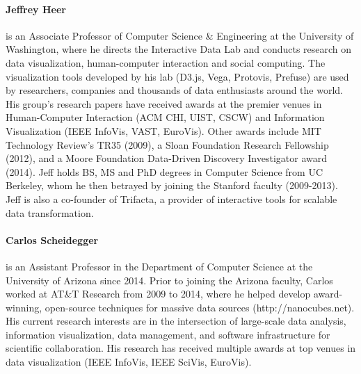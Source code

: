 \documentclass[journal]{vgtc}                %
\begin{document}
\paragraph*{Jeffrey Heer} is an Associate Professor of Computer Science \& Engineering at the University of Washington, where he directs the Interactive Data Lab and conducts research on data visualization, human-computer interaction and social computing. The visualization tools developed by his lab (D3.js, Vega, Protovis, Prefuse) are used by researchers, companies and thousands of data enthusiasts around the world. His group's research papers have received awards at the premier venues in Human-Computer Interaction (ACM CHI, UIST, CSCW) and Information Visualization (IEEE InfoVis, VAST, EuroVis). Other awards include MIT Technology Review's TR35 (2009), a Sloan Foundation Research Fellowship (2012), and a Moore Foundation Data-Driven Discovery Investigator award (2014). Jeff holds BS, MS and PhD degrees in Computer Science from UC Berkeley, whom he then betrayed by joining the Stanford faculty (2009-2013). Jeff is also a co-founder of Trifacta, a provider of interactive tools for scalable data transformation.

\paragraph*{Carlos Scheidegger} is an Assistant Professor in the Department of Computer Science at the University of Arizona since 2014. Prior to joining the Arizona faculty, Carlos worked at AT\&T Research from 2009 to 2014, where he helped develop award-winning, open-source techniques for massive data sources (http://nanocubes.net). His current research interests are in the intersection of large-scale data analysis, information visualization, data management, and software infrastructure for scientific collaboration. His research has received multiple awards at top venues in data visualization (IEEE InfoVis, IEEE SciVis, EuroVis).



%
%
\end{document}
